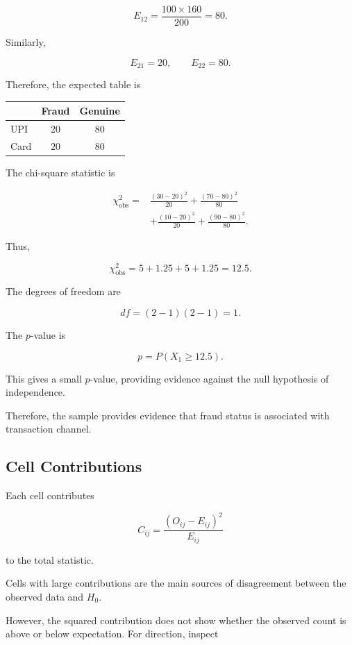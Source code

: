 \documentclass[11pt]{article}
\begin{document}
\[
E_{12}
=
\frac{100\times160}{200}
=
80.
\]

Similarly,

\[
E_{21}=20,
\qquad
E_{22}=80.
\]

Therefore, the expected table is

\begin{center}
\begin{tabular}{lcc}
\toprule
 & Fraud & Genuine \\
\midrule
UPI  & \(20\) & \(80\) \\
Card & \(20\) & \(80\) \\
\bottomrule
\end{tabular}
\end{center}

The chi-square statistic is

\[
\begin{aligned}
\chi^2_{\mathrm{obs}}
={}&
\frac{(30-20)^2}{20}
+
\frac{(70-80)^2}{80}\\
&+
\frac{(10-20)^2}{20}
+
\frac{(90-80)^2}{80}.
\end{aligned}
\]

Thus,

\[
\chi^2_{\mathrm{obs}}
=
5+1.25+5+1.25
=
12.5.
\]

The degrees of freedom are

\[
df=(2-1)(2-1)=1.
\]

The \(p\)-value is

\[
p=P(X_1\geq12.5).
\]

This gives a small \(p\)-value, providing evidence against the null
hypothesis of independence.

Therefore, the sample provides evidence that fraud status is associated
with transaction channel.

\subsection{Cell Contributions}

Each cell contributes

\[
C_{ij}
=
\frac{(O_{ij}-E_{ij})^2}{E_{ij}}
\]

to the total statistic.

Cells with large contributions are the main sources of disagreement
between the observed data and \(H_0\).

However, the squared contribution does not show whether the observed
count is above or below expectation. For direction, inspect
\end{document}
